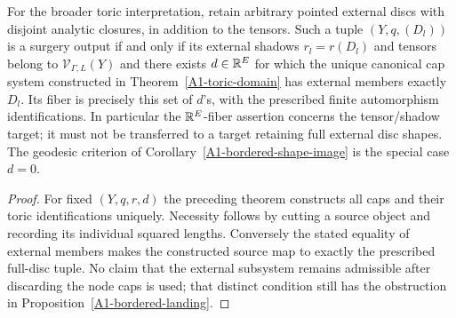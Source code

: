 \begin{corollary}
\label{A1-toric-full-discs}
For the broader toric interpretation, retain arbitrary pointed
external discs with disjoint analytic closures, in addition to
the tensors. Such a tuple $(Y,q,(D_l))$ is a surgery output if and
only if its external shadows $r_l=r(D_l)$ and tensors belong to
$\mathcal V_{\Gamma,L}(Y)$ and there exists $d\in{\ensuremath{\mathbb{R}}}^E$ for which
the unique canonical cap system constructed in
Theorem~\ref{A1-toric-domain} has external members exactly $D_l$.
Its fiber is precisely this set of $d$'s, with the prescribed
finite automorphism identifications. In particular the
${\mathbb{R}}^E$-fiber assertion concerns the tensor/shadow target; it
must not be transferred to a target retaining full external
disc shapes. The geodesic criterion of
Corollary~\ref{A1-bordered-shape-image} is the special case $d=0$.
\end{corollary}
\begin{proof}
For fixed $(Y,q,r,d)$ the preceding theorem constructs all caps and
their toric identifications uniquely. Necessity follows by cutting
a source object and recording its individual squared lengths.
Conversely the stated equality of external members makes the
constructed source map to exactly the prescribed full-disc tuple.
No claim that the external subsystem remains admissible after
discarding the node caps is used; that distinct condition still
has the obstruction in Proposition~\ref{A1-bordered-landing}.
\end{proof}
